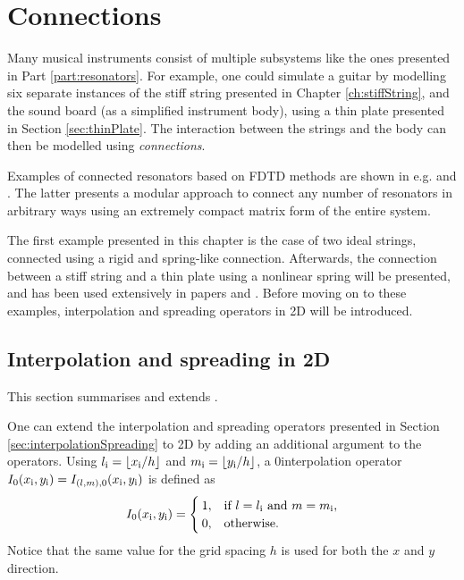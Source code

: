 \chapter{Connections}\label{ch:connections}
Many musical instruments consist of multiple subsystems like the ones presented in Part \ref{part:resonators}. For example, one could simulate a guitar by modelling six separate instances of the stiff string presented in Chapter \ref{ch:stiffString}, and the sound board (as a simplified instrument body), using a thin plate presented in Section \ref{sec:thinPlate}. 
The interaction between the strings and the body can then be modelled using \textit{connections}. %

Examples of connected resonators based on FDTD methods are shown in e.g. \cite{theBible} and \cite{Bilbao2009Modular}. The latter presents a modular approach to connect any number of resonators in arbitrary ways using an extremely compact matrix form of the entire system.

The first example presented in this chapter is the case of two ideal strings, connected using a rigid and spring-like connection. Afterwards, the connection between a stiff string and a thin plate using a nonlinear spring will be presented, and has been used extensively in papers \citeP[A] and \citeP[B]. Before moving on to these examples, interpolation and spreading operators in 2D will be introduced.

\section{Interpolation and spreading in 2D}\label{sec:interpolationSpreading2D}
This section summarises and extends \cite[Sec. 10.2.1, pp. 293--294]{theBible}.

One can extend the interpolation and spreading operators presented in Section \ref{sec:interpolationSpreading} to 2D by adding an additional argument to the operators. Using $l_\itxt = \floor[x_\itxt / h]$ and $m_\itxt = \floor[y_\itxt / h]$, a $0$\thOrder interpolation operator $I_0(x_{\text{i}}, y_{\text{i}}) = I_{(l, m), 0}(x_{\text{i}}, y_{\text{i}})$ is defined as
\begin{equation}
    I_0(x_{\text{i}}, y_{\text{i}}) = \begin{cases}
        1, & \text{if } l = l_{\text{i}} \text{ and } m = m_{\text{i}},\\
        0, & \text{otherwise}.
    \end{cases}
\end{equation}
Notice that the same value for the grid spacing $h$ is used for both the $x$ and $y$ direction.

